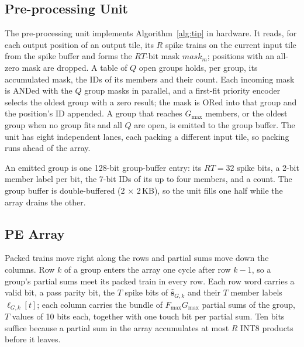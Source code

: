 \subsection{Pre-processing Unit}
\label{sec:arch-pre}
The pre-processing unit implements Algorithm~\ref{alg:tip} in hardware. It reads, for each output position of an
output tile, its $R$ spike trains on the current input tile from the spike buffer and forms the $RT$-bit mask
$\mathit{mask}_m$; positions with an all-zero mask are dropped. A table of $Q$ open groups holds, per group, its
accumulated mask, the IDs of its members and their count. Each incoming mask is ANDed with the $Q$ group masks in
parallel, and a first-fit priority encoder selects the oldest group with a zero result; the mask is ORed into
that group and the position's ID appended. A group that reaches $G_{\max}$ members, or the oldest group when no
group fits and all $Q$ are open, is emitted to the group buffer. The unit has eight independent lanes, each
packing a different input tile, so packing runs ahead of the array.

An emitted group is one 128-bit group-buffer entry: its $RT = 32$ spike bits, a 2-bit member label per bit, the
7-bit IDs of its up to four members, and a count. The group buffer is double-buffered (2 $\times$ 2\,KB), so the
unit fills one half while the array drains the other.

\subsection{PE Array}
\label{sec:arch-array}
Packed trains move right along the rows and partial sums move down the columns. Row $k$ of a group enters the
array one cycle after row $k-1$, so a group's partial sums meet its packed train in every row. Each row word
carries a valid bit, a pass parity bit, the $T$ spike bits of $\hat{\mathbf{s}}_{G,k}$ and their $T$ member labels
$\ell_{G,k}[t]$; each column carries the bundle of $F_{\max} G_{\max}$ partial sums of the group, $T$ values of
10 bits each, together with one touch bit per partial sum. Ten bits suffice because a partial sum in the array
accumulates at most $R$ INT8 products before it leaves.

